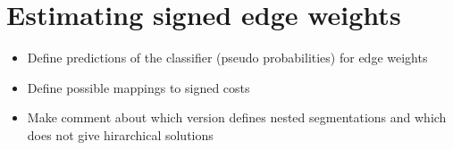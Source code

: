 
\section{Estimating signed edge weights}
\begin{itemize}
\item Define predictions of the classifier (pseudo probabilities) for edge weights
\item Define possible mappings to signed costs
\item Make comment about which version defines nested segmentations and which does not give hirarchical solutions

\end{itemize}
